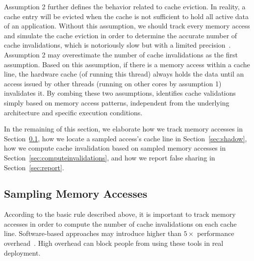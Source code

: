 Assumption 2 further defines the behavior related to cache eviction. In reality, a cache entry will be evicted when the cache is not sufficient to hold all active data of an application. Without this assumption, we should track every memory access and simulate the cache eviction in order to determine the accurate number of cache invalidations, which is notoriously slow but with a limited precision~\cite{falseshare:simulator}. Assumption 2 may overestimate the number of cache invalidations as the first assumption. Based on this assumption,  
if there is a memory access within a cache line, the hardware cache (of running this thread) always holds the data until an access issued by other threads (running on other cores by assumption 1) invalidates it. %
By combing these two assumptions, \cheetah{} identifies cache validations simply based on memory access patterns, independent from the underlying architecture and specific execution conditions. 

In the remaining of this section, we elaborate how we track memory accesses in Section~\ref{sec:perfcounter}, how we locate a sampled access's cache line in Section~\ref{sec:shadow}, how we compute cache invalidation based on sampled memory accesses in Section~\ref{sec:computeinvalidations}, and how we report false sharing in Section~\ref{sec:report}.

\subsection{Sampling Memory Accesses}
\label{sec:perfcounter}

According to the basic rule described above, it is important to track memory accesses in order to compute the number of cache invalidations on each cache line. Software-based approaches may introduce higher than $5\times$ performance overhead~\cite{Predator, qinzhao}. High overhead can block people from using these tools in real deployment.


